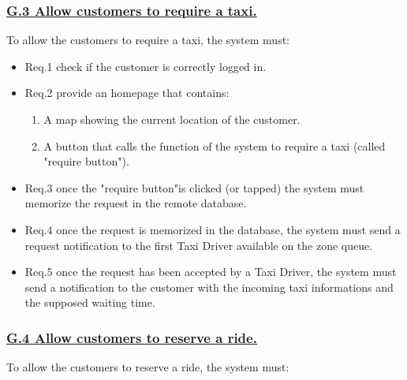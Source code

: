 \documentclass{report}
\begin{document}
			\subsubsection{\lbrack \hyperref[sec:g3]{G.3 Allow customers to require a taxi.}\rbrack}
			To allow the customers to require a taxi, the system must:

				\begin{itemize}
					\item \lbrack Req.1\rbrack \label{sec:fr1_g3} check if the customer is correctly logged in.
					\item \lbrack Req.2\rbrack \label{sec:fr2_g3} provide an homepage that contains:
						\begin{enumerate}
							\item A map showing the current location of the customer.
							\item A button that calls the function of the system to require a taxi (called "require button").
						\end{enumerate}
					\item \lbrack Req.3\rbrack \label{sec:fr3_g3} once the "require button"is clicked (or tapped) the system must memorize the request in the remote database.
					\item \lbrack Req.4\rbrack \label{sec:fr4_g3} once the request is memorized in the database, the system must send a request notification to the first Taxi Driver available on the zone queue.
					\item \lbrack Req.5\rbrack \label{sec:fr5_g3} once the request has been accepted by a Taxi Driver, the system must send a notification to the customer with the incoming taxi informations and the supposed waiting time.
				\end{itemize}

			\subsubsection{\lbrack \hyperref[sec:g4]{G.4 Allow customers to reserve a ride.}\rbrack}
			To allow the customers to reserve a ride, the system must:
\end{document}
